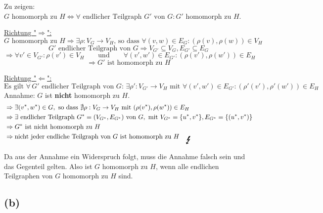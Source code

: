 \documentclass[11pt, a4paper]{article}
\begin{document}
Zu zeigen:
$G \text{ homomorph zu } H \iff \forall \text{ endlicher Teilgraph } G' \text{ von } G: G' \text{ homomorph zu } H$.

\underline{Richtung "$\Rightarrow$":}\\
$$G \text{ homomorph zu } H \Rightarrow \exists \rho: V_G \rightarrow V_H \text{, so dass } \forall (v,w) \in E_G: (\rho(v),\rho(w)) \in V_H$$
$$G' \text{ endlicher Teilgraph von } G \Rightarrow V_{G'} \subseteq V_{G}, E_{G'} \subseteq E_G$$
$$\Rightarrow \forall v' \in V_{G'}: \rho(v') \in V_H \qquad\text{und}\qquad \forall (v',w') \in E_{G'}: (\rho(v'), \rho(w')) \in E_H$$
$$\Rightarrow G' \text{ ist homomorph zu } H$$


\underline{Richtung "$\Leftarrow$":}\\
$$\text{Es gilt } \forall\, G' \text{ endlicher Teilgraph von } G: \, \exists \rho': V_{G'} \rightarrow V_H \text{ mit } \forall (v',w') \in E_{G'}: (\rho'(v'), \rho'(w')) \in E_H$$
Annahme: $G$ ist \textbf{nicht} homomorph zu $H$.
\begin{align*}
    & \Rightarrow \exists (v^*,w^*) \in G, \text{ so dass } \nexists \rho: V_G \rightarrow V_H \text{ mit } (\rho(v^*),\rho(w^*)) \in E_H \\
    & \Rightarrow \exists \text{ endlicher Teilgraph } G^*=(V_{G^*}, E_{G^*}) \text{ von } G, \text{ mit } V_{G^*} = \{u^*,v^*\}, E_{G^*} = \{(u^*,v^*)\} \\
    & \Rightarrow G^* \text{ ist nicht homomorph zu } H \\
    & \Rightarrow \text{nicht jeder endliche Teilgraph von } G \text{ ist homomorph zu } H \quad_\text{\LARGE\Lightning}
\end{align*}

Da aus der Annahme ein Widerspruch folgt, muss die Annahme falsch sein und das Gegenteil gelten.
Also ist $G$ homomorph zu $H$, wenn alle endlichen Teilgraphen von $G$ homomorph zu $H$ sind.

\subsection*{(b)}
\end{document}
